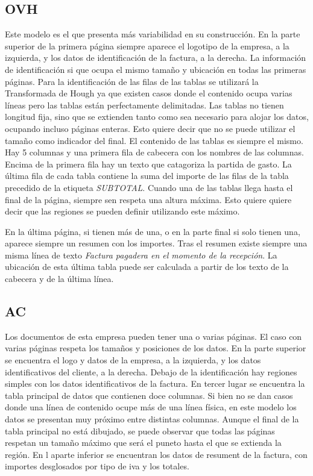 \subsection{OVH}

Este modelo es el que presenta más variabilidad en su construcción. En la parte superior de la primera página siempre aparece el logotipo de la empresa, a la izquierda, y los datos de identificación de la factura, a la derecha. La información de identificación si que ocupa el mismo tamaño y ubicación en todas las primeras páginas. Para la identificación de las filas de las tablas se utilizará la Transformada de Hough ya que existen casos donde el contenido ocupa varias líneas pero las tablas están perfectamente delimitadas. Las tablas no tienen longitud fija, sino que se extienden tanto como sea necesario para alojar los datos, ocupando incluso páginas enteras. Esto quiere decir que no se puede utilizar el tamaño como indicador del final. El contenido de las tablas es siempre el mismo. Hay 5 columnas y una primera fila de cabecera con los nombres de las columnas. Encima de la primera fila hay un texto que catagoriza la partida de gasto. La última fila de cada tabla contiene la suma del importe de las filas de la tabla precedido de la etiqueta \emph{SUBTOTAL}. Cuando una de las tablas llega hasta el final de la página, siempre sen respeta una altura máxima. Esto quiere quiere decir que las regiones se pueden definir utilizando este máximo.

En la última página, si tienen más de una, o en la parte final si solo tienen una, aparece siempre un resumen con los importes. Tras el resumen existe siempre una misma línea de texto \emph{Factura pagadera en el momento de la recepción}. La ubicación de esta última tabla puede ser calculada a partir de los texto de la cabecera y de la última línea.

\subsection{AC}

Los documentos de esta empresa pueden tener una o varias páginas. El caso con varias páginas respeta los tamaños y posiciones de los datos. En la parte superior se encuentra el logo y datos de la empresa, a la izquierda, y los datos identificativos del cliente, a la derecha. Debajo de la identificación hay regiones simples con los datos identificativos de la factura. En tercer lugar se encuentra la tabla principal de datos que contienen doce columnas. Si bien no se dan casos donde una línea de contenido ocupe más de una línea física, en este modelo los datos se presentan muy próximo entre distintas columnas. Aunque el final de la tabla principal no está dibujado, se puede observar que todas las páginas respetan un tamaño máximo que será el puneto hasta el que se extienda la región. En l aparte inferior se encuentran los datos de resument de la factura, con importes desglosados por tipo de iva y los totales.
 
